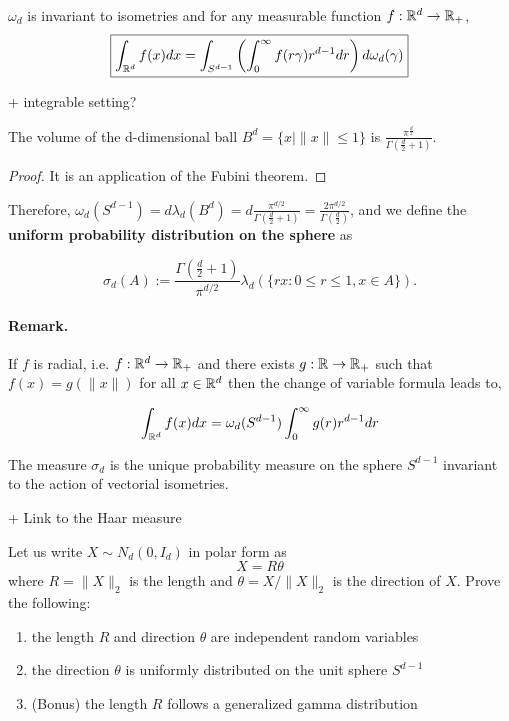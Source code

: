 \documentclass{article}
\begin{document}
\begin{theorem}
  $\omega_d$ is invariant to isometries and for any measurable function $f: \mathbb{R}^{d} \to \mathbb{R}_+$, $$\boxed{\int_{\mathbb{R}^{d}} f(x) d x=\int_{S^{d-1}}\left(\int_{0}^{\infty} f(r \gamma) r^{d-1} d r\right) d \omega_d(\gamma)}$$
\end{theorem}

+ integrable setting? 

\begin{prop}
  The volume of the d-dimensional ball $B^d = \{x \mid \|x\| \leq 1\} $ is $\frac{\pi^{\frac{d}{2}}}{\Gamma\left(\frac{d}{2}+1\right)}$.
\end{prop}

\begin{proof}
  It is an application of the Fubini theorem.
\end{proof}
Therefore, $\omega_d(S^{d-1}) = d\lambda_d(B^d) = d\frac{\pi^{d /
    2}}{\Gamma\left(\frac{d}{2}+1\right)} = \frac{2 \pi^{d /
    2}}{\Gamma\left(\frac{d}{2}\right)} $, and we define the \textbf{uniform
  probability distribution on the sphere} as

\begin{equation}
  \sigma_{d}(A):=\frac{\Gamma\left(\frac{d}{2}+1\right)}{\pi^{d / 2}} \lambda_{d}(\{r x: 0 \leq r \leq 1, x \in A\}).
\end{equation}

\paragraph{Remark.} If $f$ is radial, i.e. $f: \mathbb{R}^{d}\to \mathbb{R}_+$ and there exists $g: \mathbb{R}
\to \mathbb{R}_+$ such that $f(x) = g(\|x\|)$ for all $x \in \mathbb{R}^{d}$ then the change of
variable formula leads to,

\begin{equation}
  \int_{\mathbb{R}^{d}} f(x) d x= \omega_d(S^{d-1})\int_{0}^{\infty} g(r)r^{d-1} d r
\end{equation}

\begin{prop}
  The measure $\sigma_{d}$ is the unique probability measure on the sphere
  $S^{d-1}$ invariant to the action of vectorial isometries.
\end{prop}

+ Link to the Haar measure

\begin{prop}[Exercise 3.3.7] Let us write $X \sim N_d\left(0, I_{d}\right)$ in
  polar  form as
  $$
  X=R \theta
  $$
  where $R=\|X\|_{2}$ is the length and $\theta=X /\|X\|_{2}$ is the direction
  of $X$. Prove the following:

  \begin{enumerate}
  \item the length $R$ and direction $\theta$ are independent random variables
  \item the direction $\theta$ is uniformly distributed on the unit sphere
    $S^{d-1}$
  \item (Bonus) the length $R$ follows a generalized gamma distribution
  \end{enumerate}
\end{prop}
\end{document}
